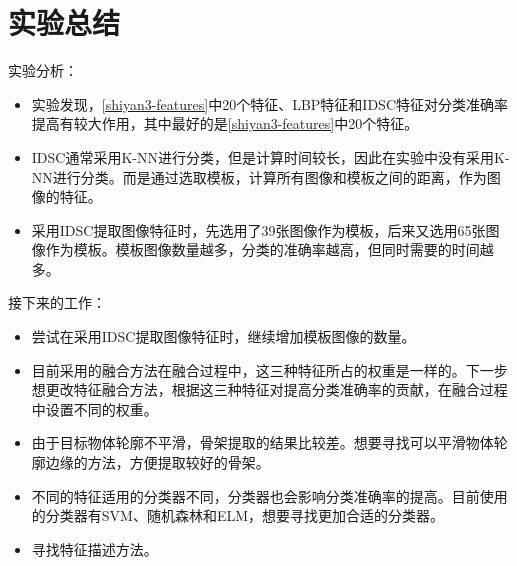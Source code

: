 \section{实验总结}
实验分析：
\begin{itemize}
\item 实验发现，\ref{shiyan3-features}中20个特征、LBP特征和IDSC特征对分类准确率提高有较大作用，其中最好的是\ref{shiyan3-features}中20个特征。
\item IDSC通常采用K-NN进行分类，但是计算时间较长，因此在实验中没有采用K-NN进行分类。而是通过选取模板，计算所有图像和模板之间的距离，作为图像的特征。
\item 采用IDSC提取图像特征时，先选用了39张图像作为模板，后来又选用65张图像作为模板。模板图像数量越多，分类的准确率越高，但同时需要的时间越多。
\end{itemize}
接下来的工作：
\begin{itemize}
\item 尝试在采用IDSC提取图像特征时，继续增加模板图像的数量。
\item 目前采用的融合方法在融合过程中，这三种特征所占的权重是一样的。下一步想更改特征融合方法，根据这三种特征对提高分类准确率的贡献，在融合过程中设置不同的权重。
\item 由于目标物体轮廓不平滑，骨架提取的结果比较差。想要寻找可以平滑物体轮廓边缘的方法，方便提取较好的骨架。
\item 不同的特征适用的分类器不同，分类器也会影响分类准确率的提高。目前使用的分类器有SVM、随机森林和ELM，想要寻找更加合适的分类器。
\item 寻找特征描述方法。
\end{itemize}

\begin{comment}
2015.9.15
\begin{itemize}
\item MATLAB进行实验的结果要比C的好，因此实验以MATLAB为主。
\item 在进行实验过程中，PKID中的特征只使用了13个（原来计划选用22个）。原因是由于图像质量原因，特征提取效果不是特别好，以至于一些特征对分类准确率的提升没有太大贡献。另外，还有两个特征我没有找到计算方法，但我感觉对实验结果提高不会有太大影响。
\item 实验中提取的特征不如PkID系统中的特征好（有一部分原因是实验中特征提取是对图像提取的，而图像质量又较低，导致提取的特征不准确。PkID系统中的基本特征都是从ZooProcess中得到的，能更好的反映浮游动物的特征），其分类的准确率也比PkID系统中的特征低2到3个百分点。
\item 因为需要使用的特征既有特征值，也有特征向量，这些特征直接一起使用会降低准确率，因此需要进行了特征融合（实验四、五）。目前采用了20个特征与LBP特征融合，分类的准确率有了一定的提高（达到76.1\%）。
\end{itemize}

接下来的工作：在特征融合的基础上继续进行实验，实验将不同形式的特征结合来得到更高的分类准确率。
\end{comment}